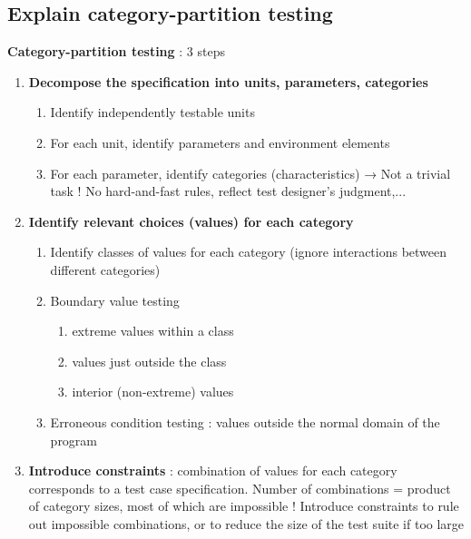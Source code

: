 \documentclass{article}
\begin{document}
\subsection{Explain category-partition testing}
\noindent\textbf{Category-partition testing} : 3 steps
\begin{enumerate}
    \item \textbf{Decompose the specification into units, parameters, categories}
    \begin{enumerate}
        \item Identify independently testable units
        \item For each unit, identify parameters and environment elements
        \item For each parameter, identify categories (characteristics) → Not a trivial task ! No
hard-and-fast rules, reflect test designer’s judgment,...\\
    \end{enumerate}
    \item \textbf{Identify relevant choices (values) for each category}
    \begin{enumerate}
        \item Identify classes of values for each category (ignore interactions
between different categories)

        \item Boundary value testing
        \begin{enumerate}
            \item extreme values within a class
            \item values just outside the class
            \item interior (non-extreme) values
        \end{enumerate}
        \item Erroneous condition testing : values outside the normal domain of the program\\

    \end{enumerate}
    \item  \textbf{Introduce constraints} : combination of values for each category corresponds to a test case specification. Number of combinations = product of category sizes, most of which are impossible ! Introduce constraints to rule out impossible combinations, or to reduce the size of the test suite if too large
\end{enumerate}
\end{document}
